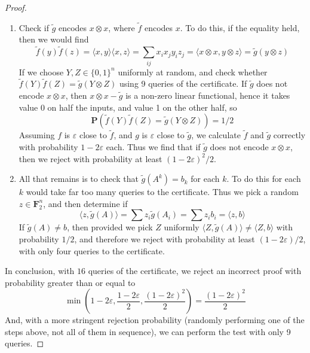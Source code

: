 \begin{proof}
\begin{enumerate}
        \item Check if $\tilde{g}$ encodes $x \otimes x$, where $\tilde{f}$ encodes $x$. To do this, if the equality held, then we would find
        \[ \tilde{f}(y) \tilde{f}(z) = \langle x, y \rangle \langle x, z \rangle = \sum_{ij} x_i x_j y_iz_j = \langle x \otimes x, y \otimes z \rangle = \tilde{g}(y \otimes z) \]
        If we choose $Y,Z \in \{ 0,1 \}^n$ uniformly at random, and check whether $\tilde{f}(Y) \tilde{f}(Z) = \tilde{g}(Y \otimes Z)$ using 9 queries of the certificate. If $\tilde{g}$ does not encode $x \otimes x$, then $x \otimes x - \tilde{g}$ is a non-zero linear functional, hence it takes value 0 on half the inputs, and value 1 on the other half, so
        \[ \mathbf{P}(\tilde{f}(Y) \tilde{f}(Z) = \tilde{g}(Y \otimes Z)) = 1/2 \]
        Assuming $f$ is $\varepsilon$ close to $\tilde{f}$, and $g$ is $\varepsilon$ close to $\tilde{g}$, we calculate $\tilde{f}$ and $\tilde{g}$ correctly with probability $1 - 2\varepsilon$ each. Thus we find that if $\tilde{g}$ does not encode $x \otimes x$, then we reject with probability at least $(1 - 2\varepsilon)^2/2$.

        \item All that remains is to check that $\tilde{g}(A^k) = b_k$ for each $k$. To do this for each $k$ would take far too many queries to the certificate. Thus we pick a random $z \in \mathbf{F}_2^n$, and then determine if
        \[ \langle z, \tilde{g}(A) \rangle = \sum z_i \tilde{g}(A_i) = \sum z_i b_i = \langle z, b \rangle \]
        If $\tilde{g}(A) \neq b$, then provided we pick $Z$ uniformly $\langle Z, \tilde{g}(A) \rangle \neq \langle Z, b \rangle$ with probability $1/2$, and therefore we reject with probability at least $(1 - 2\varepsilon)/2$, with only four queries to the certificate.
    \end{enumerate}
    In conclusion, with $16$ queries of the certificate, we reject an incorrect proof with probability greater than or equal to 
    \[ \min \left( 1 - 2 \varepsilon, \frac{1 - 2 \varepsilon}{2}, \frac{(1 - 2 \varepsilon)^2}{2} \right) = \frac{(1 - 2\varepsilon)^2}{2} \]
    And, with a more stringent rejection probability (randomly performing one of the steps above, not all of them in sequence), we can perform the test with only 9 queries.
\end{proof}
























